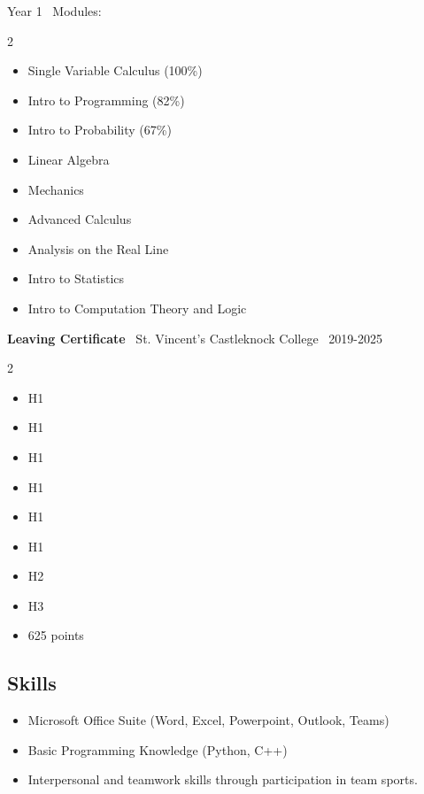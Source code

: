 \documentclass{article}
\begin{document}
\vspace{1mm}
Year 1 \textbar \ Modules:
\begin{multicols}{2}
\begin{small}
    \begin{itemize}
        \item Single Variable Calculus (100\%)
        \item Intro to Programming (82\%)
        \item Intro to Probability (67\%)        
        \item Linear Algebra
        \item Mechanics
        \item Advanced Calculus
        \item Analysis on the Real Line
        \item Intro to Statistics
        \item Intro to Computation Theory and Logic
    \end{itemize}
\end{small}
\end{multicols}

\vspace{2mm}
\textbf{Leaving Certificate} \textbar \ St. Vincent's Castleknock College \textbar \ 2019-2025
\begin{multicols}{2}
\begin{small}
    \begin{itemize}
        \item {} H1
        \item {} H1
        \item {} H1
        \item {} H1
        \item {} H1
        \item {} H1
        \item {} H2
        \item {} H3
    \end{itemize}
\end{small}
\end{multicols}
\begin{itemize}
    \item {} 625 points
\end{itemize}

\subsection*{Skills}
\begin{small}
    \begin{itemize}
        \item Microsoft Office Suite (Word, Excel, Powerpoint, Outlook, Teams)
        \item Basic Programming Knowledge (Python, C++)
        \item Interpersonal and teamwork skills through participation in team sports.
    \end{itemize}
\end{small}
\end{document}
